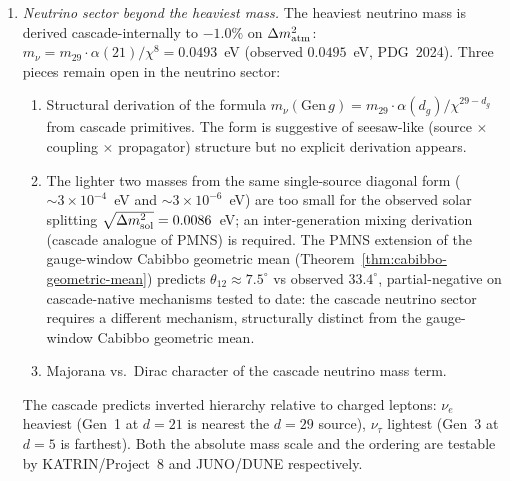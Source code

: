 \documentclass[12pt,a4paper]{article}
\begin{document}
\begin{enumerate}
\item \emph{Neutrino sector beyond the heaviest mass.} The heaviest neutrino mass is derived cascade-internally to $-1.0\%$ on $\Delta m^2_{\rm atm}$: $m_\nu = m_{29}\cdot\alpha(21)/\chi^8 = 0.0493$~eV (observed $0.0495$~eV, PDG~2024). Three pieces remain open in the neutrino sector:
\begin{enumerate}[label=(\alph*),nosep]
\item Structural derivation of the formula $m_\nu(\mathrm{Gen}\,g) = m_{29}\cdot\alpha(d_g)/\chi^{29-d_g}$ from cascade primitives. The form is suggestive of seesaw-like (source $\times$ coupling $\times$ propagator) structure but no explicit derivation appears.
\item The lighter two masses from the same single-source diagonal form ($\sim 3\times 10^{-4}$~eV and $\sim 3\times 10^{-6}$~eV) are too small for the observed solar splitting $\sqrt{\Delta m^2_{\rm sol}}=0.0086$~eV; an inter-generation mixing derivation (cascade analogue of PMNS) is required. The PMNS extension of the gauge-window Cabibbo geometric mean (Theorem~\ref{thm:cabibbo-geometric-mean}) predicts $\theta_{12}\approx 7.5^\circ$ vs observed $33.4^\circ$, partial-negative on cascade-native mechanisms tested to date: the cascade neutrino sector requires a different mechanism, structurally distinct from the gauge-window Cabibbo geometric mean.
\item Majorana vs.\ Dirac character of the cascade neutrino mass term.
\end{enumerate}
The cascade predicts inverted hierarchy relative to charged leptons: $\nu_e$ heaviest (Gen~1 at $d=21$ is nearest the $d=29$ source), $\nu_\tau$ lightest (Gen~3 at $d=5$ is farthest). Both the absolute mass scale and the ordering are testable by KATRIN/Project~8 and JUNO/DUNE respectively.


\end{enumerate}
\end{document}
